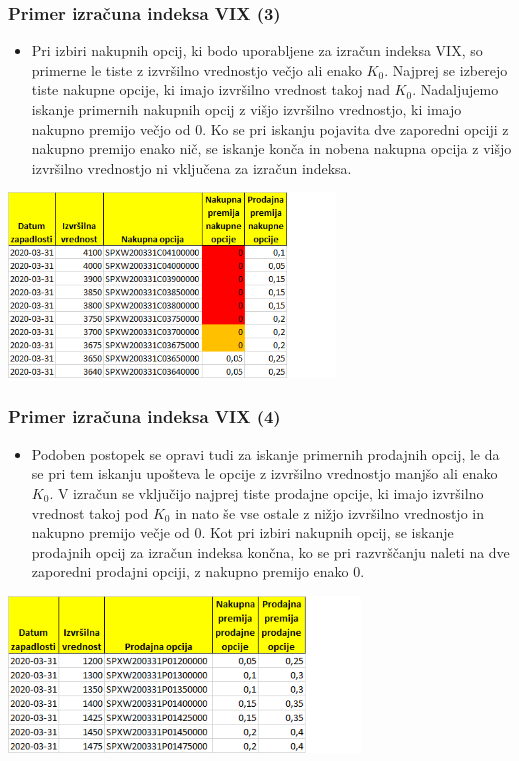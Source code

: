 \documentclass[10pt]{beamer}
\begin{document}
\begin{frame}
\frametitle{Primer izračuna indeksa VIX (3)}
\begin{itemize}
\item Pri izbiri nakupnih opcij, ki bodo uporabljene za izračun indeksa VIX, so primerne le tiste z izvršilno vrednostjo večjo ali enako $K_0$. Najprej se izberejo tiste nakupne opcije, ki imajo izvršilno vrednost takoj nad $K_0$. Nadaljujemo iskanje primernih nakupnih opcij z višjo izvršilno vrednostjo, ki imajo nakupno premijo večjo od 0. Ko se pri iskanju pojavita dve zaporedni opciji z nakupno premijo enako nič, se iskanje konča in nobena nakupna opcija z višjo izvršilno vrednostjo ni vključena za izračun indeksa.
\end{itemize}
\begin{center}
\includegraphics[width=0.65\textwidth]{./Grafi/Calls_T1_clean.png}
\end{center}
\end{frame}


\begin{frame}
\frametitle{Primer izračuna indeksa VIX (4)}
\begin{itemize}
\item Podoben postopek se opravi tudi za iskanje primernih prodajnih opcij, le da se pri tem iskanju upošteva le opcije z izvršilno vrednostjo manjšo ali enako $K_0$. V izračun se vključijo najprej tiste prodajne opcije, ki imajo izvršilno vrednost takoj pod $K_0$ in nato še vse ostale z nižjo izvršilno vrednostjo in nakupno premijo večje od 0. Kot pri izbiri nakupnih opcij, se iskanje prodajnih opcij za izračun indeksa končna, ko se pri razvrščanju naleti na dve zaporedni prodajni opciji, z nakupno premijo enako 0.
\end{itemize}
\begin{center}
\includegraphics[width=0.7\textwidth]{./Grafi/Puts_T1_clean.png}
\end{center}
\end{frame}
\end{document}
